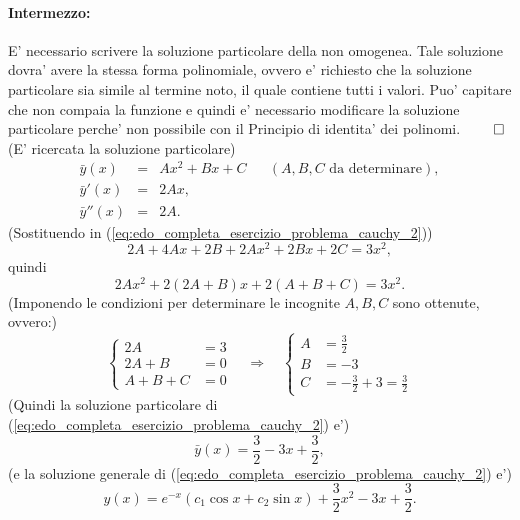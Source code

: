 \begin{example}
	\paragraph{Intermezzo:} E' necessario scrivere la soluzione particolare della non omogenea. Tale soluzione dovra' avere la stessa forma polinomiale, ovvero e' richiesto che la soluzione particolare sia simile al termine noto, il quale contiene tutti i valori. Puo' capitare che non compaia la funzione e quindi e' necessario modificare la soluzione particolare perche' non possibile con il Principio di identita' dei polinomi. $\qed$
	(E' ricercata la soluzione particolare)
	\begin{equation*}
		\begin{matrix}
			\bar y(x) &=& A x^2 + Bx + C && (A,B,C \text{ da determinare}),\\
			\bar y'(x) &=& 2Ax,\\
			\bar y''(x) &=& 2A.
		\end{matrix}
	\end{equation*}
	(Sostituendo in (\ref{eq:edo_completa_esercizio_problema_cauchy_2}))
	\begin{equation*}
		2A + 4Ax + 2B + 2Ax^2 + 2Bx + 2C = 3x^2,
	\end{equation*}
	quindi
	\begin{equation*}
		2A x^2 + 2(2A+B)x + 2(A+B+C) = 3x^2.
	\end{equation*}
	(Imponendo le condizioni per determinare le incognite $A,B,C$ sono ottenute, ovvero:)
	\begin{equation*}
		\begin{cases}
			2A &= 3\\
			2 A + B &= 0\\
			A + B + C &=0 
		\end{cases}\quad\Rightarrow\quad
		\begin{cases}
			A &= \frac{3}{2}\\
			B &= -3\\
			C &= -\frac{3}{2} + 3 = \frac{3}{2}
		\end{cases}
	\end{equation*}
	(Quindi la soluzione particolare di (\ref{eq:edo_completa_esercizio_problema_cauchy_2}) e')
	\begin{equation*}
		\bar y(x) = \frac{3}{2} -3x + \frac{3}{2},
	\end{equation*}
	(e la soluzione generale di (\ref{eq:edo_completa_esercizio_problema_cauchy_2}) e')
	\begin{equation*}
		y(x) = e^{-x} (c_1\cos x + c_2\sin x) + \frac{3}{2} x^2 - 3x + \frac{3}{2}.

\end{equation*}
\end{example}
